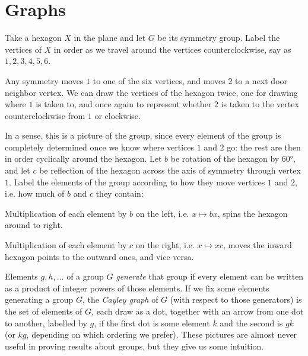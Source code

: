 \section{Graphs}
\begin{example}
Take a hexagon \(X\) in the plane and let \(G\) be its symmetry group.
Label the vertices of \(X\) in order as we travel around the vertices counterclockwise, say as \(1,2,3,4,5,6\).
\begin{center}

\end{center}
Any symmetry moves \(1\) to one of the six vertices, and moves \(2\) to a next door neighbor vertex.
We can draw the vertices of the hexagon twice, one for drawing where \(1\) is taken to, and once again to represent whether \(2\) is taken to the vertex counterclockwise from \(1\) or clockwise.
\begin{center}

\end{center}
In a sense, this is a picture of the group, since every element of the group is completely determined once we know where vertices \(1\) and \(2\) go: the rest are then in order cyclically around the hexagon.
Let \(b\) be rotation of the hexagon by \(60\si{\degree}\), and let \(c\) be reflection of the hexagon across the axis of symmetry through vertex \(1\).
Label the elements of the group according to how they move vertices \(1\) and \(2\), i.e. how much of \(b\) and \(c\) they contain:
\begin{center}

\end{center}
Multiplication of each element by \(b\) on the left, i.e. \(x \mapsto bx\), spins the hexagon around to right.
\begin{center}

\end{center}
Multiplication of each element by \(c\) on the right, i.e. \(x \mapsto xc\), moves the inward hexagon points to the outward ones, and vice versa.
\end{example}

Elements \(g, h, \dots\) of a group \(G\) \emph{generate} that group if every element can be written as a product of integer powers of those elements.
If we fix some elements generating a group \(G\), the \emph{Cayley graph} of \(G\) (with respect to those generators) is the set of elements of \(G\), each draw as a dot, together with an arrow from one dot to another, labelled by \(g\), if the first dot is some element \(k\) and the second is \(gk\) (or \(kg\), depending on which ordering we prefer).
These pictures are almost never useful in proving results about groups, but they give us some intuition.


